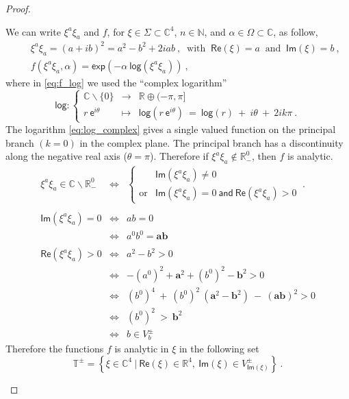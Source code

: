 \documentclass[11pt]{book}
\renewcommand{\Re}{\mathsf{Re}}
\renewcommand{\Im}{\mathsf{Im}}
\renewcommand{\exp}{\mathsf{exp}}
\renewcommand{\log}{\mathsf{log}}
\newcommand{\Cbb}{\mathbb{C}}
\newcommand{\Nbb}{\mathbb{N}}
\theoremstyle{break}
\begin{document}
\begin{proof}
\begin{description}
We can write $\xi^{a}\xi_{a}$ and $f$, for $\xi \in \Sigma \subset \Cbb^4$, $n \in \Nbb$, and $\alpha \in \Omega \subset \Cbb$, as follow,
%
\begin{eqnarray}
&& \xi^{a}\xi_{a} = (a+ib)^2 = a^2 - b^2 + 2iab \ , \ \mbox{ with } \ \Re(\xi)=a \ \mbox{ and } \ \Im(\xi)=b \ , \nonumber \\[2pt]
%
&& f(\xi^a\xi_{a},\alpha) = \exp\left(-\alpha \ \log(\xi^{a}\xi_{a}) \right) \ ,
\label{eq:f_log}
\end{eqnarray}
%
where in \eqref{eq:f_log} we used the ``complex logarithm'' 
%
\begin{equation}
\mathsf{log}: \left\{
\begin{array}{rcl}
\mathbb{C} \backslash \{0\}  & \to & \mathbb{R} \oplus (-\pi,\pi] \\
r \ \mathsf{e}^{i\theta} & \mapsto & \mathsf{log}(r \ \mathsf{e}^{i\theta}) \ = \ \mathsf{log}(r) \ + \ i\theta \ + \ 2 i k \pi \ .
\end{array}\right.
\label{eq:log_complex}
\end{equation}
%
The logarithm \eqref{eq:log_complex} gives a single valued function on the principal branch $(k=0)$ in the complex plane. The principal branch has a discontinuity along the negative real axis ($\theta=\pi$). Therefore if $\xi^{a}\xi_{a} \notin \mathbb{R}^0_{-}$, then $f$ is analytic.
%
\begin{eqnarray*}
\xi^{a}\xi_{a} \in \mathbb{C} \backslash \mathbb{R}_{-}^0 &\Longleftrightarrow&
\left\{
\begin{array}{cll}
& \Im(\xi^{a}\xi_{a}) \neq 0 \\
\text{or} & \Im(\xi^{a}\xi_{a}) = 0 \ \mathsf{and} \ \Re(\xi^{a}\xi_{a}) > 0  
\end{array}
\right. \ . \\
&& \\
\Im(\xi^{a}\xi_{a}) = 0 &\Longleftrightarrow& ab=0 \\
&\Longleftrightarrow& a^0 b^0 = \mathbf{ab} \\
&& \\
\Re(\xi^{a}\xi_{a}) > 0 &\Longleftrightarrow& a^2 - b^2 > 0 \\
&\Longleftrightarrow& -(a^0)^2 + \mathbf{a}^2 + (b^0)^2 - \mathbf{b}^2 > 0 \nonumber \\
&\Longleftrightarrow& (b^0)^4 \ + \ (b^0)^2 \ (\mathbf{a}^2-\mathbf{b}^2) \ - \ \left(\mathbf{a}\mathbf{b}\right)^2 > 0 \nonumber \\
&\Longleftrightarrow& (b^0)^2 \ > \ \mathbf{b}^2 \nonumber \\
&\Longleftrightarrow& b \in V^{\pm}_b
\end{eqnarray*}
%
Therefore the functions $f$ is analytic in $\xi$ in the following set
%
\begin{equation}
\mathbb{T}^\pm = \left\{ \xi \in \mathbb{C}^4 \ | \ \Re(\xi)\in\mathbb{R}^4 , \ \Im(\xi)\in V^\pm_{\Im(\xi)} \right\} \ .
\label{eq:cone_analytic}
\end{equation}



\end{description}
\end{proof}
\end{document}
